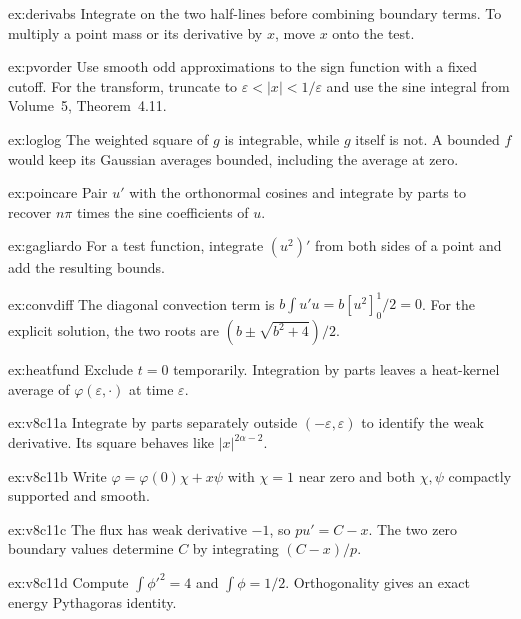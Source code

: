 \begin{hint}{ex:derivabs}
Integrate on the two half-lines before combining boundary terms. To multiply a point mass or its derivative by $x$, move $x$ onto the test.
\end{hint}
\begin{hint}{ex:pvorder}
Use smooth odd approximations to the sign function with a fixed cutoff. For the transform, truncate to $\varepsilon<|x|<1/\varepsilon$ and use the sine integral from Volume~5, Theorem~4.11.
\end{hint}
\begin{hint}{ex:loglog}
The weighted square of $g$ is integrable, while $g$ itself is not. A bounded $f$ would keep its Gaussian averages bounded, including the average at zero.
\end{hint}
\begin{hint}{ex:poincare}
Pair $u'$ with the orthonormal cosines and integrate by parts to recover $n\pi$ times the sine coefficients of $u$.
\end{hint}
\begin{hint}{ex:gagliardo}
For a test function, integrate $(u^2)'$ from both sides of a point and add the resulting bounds.
\end{hint}
\begin{hint}{ex:convdiff}
The diagonal convection term is $b\int u'u=b[u^2]_0^1/2=0$. For the explicit solution, the two roots are $(b\pm\sqrt{b^2+4})/2$.
\end{hint}
\begin{hint}{ex:heatfund}
Exclude $t=0$ temporarily. Integration by parts leaves a heat-kernel average of $\varphi(\varepsilon,\cdot)$ at time $\varepsilon$.
\end{hint}
\begin{hint}{ex:v8c11a}
Integrate by parts separately outside $(-\varepsilon,\varepsilon)$ to identify the weak derivative. Its square behaves like $|x|^{2\alpha-2}$.
\end{hint}
\begin{hint}{ex:v8c11b}
Write $\varphi=\varphi(0)\chi+x\psi$ with $\chi=1$ near zero and both $\chi,\psi$ compactly supported and smooth.
\end{hint}
\begin{hint}{ex:v8c11c}
The flux has weak derivative $-1$, so $pu'=C-x$. The two zero boundary values determine $C$ by integrating $(C-x)/p$.
\end{hint}
\begin{hint}{ex:v8c11d}
Compute $\int\phi'^2=4$ and $\int\phi=1/2$. Orthogonality gives an exact energy Pythagoras identity.
\end{hint}

